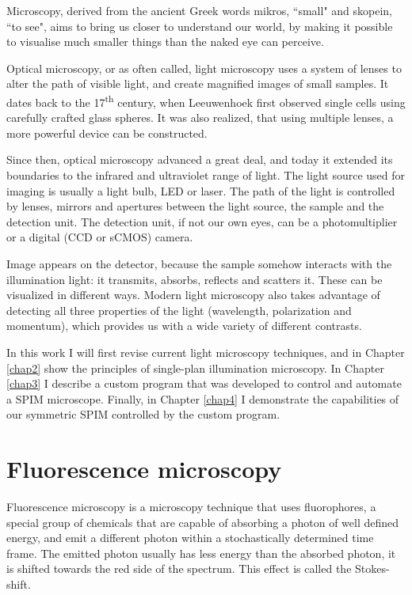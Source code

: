\documentclass{tdk_style}
\begin{document}
Microscopy, derived from the ancient Greek words mikros, ``small" and skopein, ``to see", aims to bring us closer to understand our world, by making it possible to visualise much smaller things than the naked eye can perceive.

Optical microscopy, or as often called, light microscopy uses a system of lenses to alter the path of visible light, and create magnified images of small samples. It dates back to the 17\textsuperscript{th} century, when Leeuwenhoek first observed single cells using carefully crafted glass spheres. It was also realized, that using multiple lenses, a more powerful device can be constructed.

Since then, optical microscopy advanced a great deal, and today it extended its boundaries to the infrared and ultraviolet range of light. The light source used for imaging is usually a light bulb, LED or laser. The path of the light is controlled by lenses, mirrors and apertures between the light source, the sample and the detection unit. The detection unit, if not our own eyes, can be a photomultiplier or a digital (CCD or sCMOS) camera.

Image appears on the detector, because the sample somehow interacts with the illumination light: it transmits, absorbs, reflects and scatters it. These can be visualized in different ways. Modern light microscopy also takes advantage of detecting all three properties of the light (wavelength, polarization and momentum), which provides us with a wide variety of different contrasts.

In this work I will first revise current light microscopy techniques, and in Chapter \ref{chap2} show the principles of single-plan illumination microscopy. In Chapter \ref{chap3} I describe a custom program that was developed to control and automate a SPIM microscope. Finally, in Chapter \ref{chap4} I demonstrate the capabilities of our symmetric SPIM controlled by the custom program.

\newpage

\section{Fluorescence microscopy}
Fluorescence microscopy \cite{lichtman_fluorescence_2005} is a microscopy technique that uses fluorophores, a special group  of chemicals that are capable of absorbing a photon of well defined energy, and emit a different photon within a stochastically determined time frame. The emitted photon usually has less energy than the absorbed photon, it is shifted towards the red side of the spectrum. This effect is called the Stokes-shift.
\end{document}
